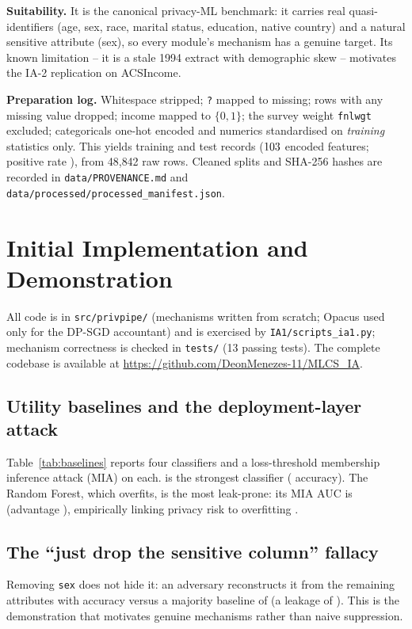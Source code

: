 \documentclass[11pt,a4paper]{article}
\begin{document}
\noindent\textbf{Suitability.} It is the canonical privacy-ML benchmark: it carries
real quasi-identifiers (age, sex, race, marital status, education, native country)
and a natural sensitive attribute (sex), so every module's mechanism has a genuine
target. Its known limitation -- it is a stale 1994 extract with demographic skew
\citep{ding2021retiring} -- motivates the IA-2 replication on ACSIncome.

\noindent\textbf{Preparation log.} Whitespace stripped; \texttt{?} mapped to missing;
rows with any missing value dropped; income mapped to $\{0,1\}$; the survey weight
\texttt{fnlwgt} excluded; categoricals one-hot encoded and numerics standardised on
\emph{training} statistics only. This yields \NTrain{} training and \NTest{} test
records ($103$ encoded features; positive rate \PosRate), from 48{,}842 raw rows.
Cleaned splits and SHA-256 hashes are recorded in \texttt{data/PROVENANCE.md} and
\texttt{data/processed/processed\_manifest.json}.

\section{Initial Implementation and Demonstration}\label{sec:impl}
All code is in \texttt{src/privpipe/} (mechanisms written from scratch; Opacus used
only for the DP-SGD accountant) and is exercised by \texttt{IA1/scripts\_ia1.py};
mechanism correctness is checked in \texttt{tests/} (13 passing tests). The complete
codebase is available at \url{https://github.com/DeonMenezes-11/MLCS_IA}.

\subsection{Utility baselines and the deployment-layer attack}
Table~\ref{tab:baselines} reports four classifiers and a loss-threshold membership
inference attack (MIA) on each. \BestModel{} is the strongest classifier
(\BestAcc{} accuracy). The Random Forest, which overfits, is the most leak-prone:
its MIA AUC is \RFMIA{} (advantage \RFAdv{}), empirically linking privacy risk to
overfitting \citep{yeom2018privacy}.
\begin{table}[htbp]\centering\caption{Utility baselines and loss-threshold MIA (mean over 3 seeds).}\label{tab:baselines}

\end{table}

\subsection{The ``just drop the sensitive column'' fallacy}
Removing \texttt{sex} does not hide it: an adversary reconstructs it from the
remaining attributes with accuracy \AIacc{} versus a majority baseline of \AIbase{}
(a leakage of \AIleak{}). This is the demonstration that motivates genuine
mechanisms rather than naive suppression.
\end{document}
